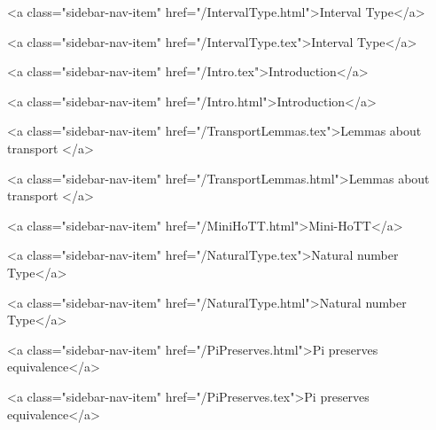       
        
          <a class="sidebar-nav-item" href="/IntervalType.html">Interval Type</a>
        
      
    
      
        
          <a class="sidebar-nav-item" href="/IntervalType.tex">Interval Type</a>
        
      
    
      
        
          <a class="sidebar-nav-item" href="/Intro.tex">Introduction</a>
        
      
    
      
        
          <a class="sidebar-nav-item" href="/Intro.html">Introduction</a>
        
      
    
      
        
          <a class="sidebar-nav-item" href="/TransportLemmas.tex">Lemmas about transport </a>
        
      
    
      
        
          <a class="sidebar-nav-item" href="/TransportLemmas.html">Lemmas about transport </a>
        
      
    
      
        
          <a class="sidebar-nav-item" href="/MiniHoTT.html">Mini-HoTT</a>
        
      
    
      
        
          <a class="sidebar-nav-item" href="/NaturalType.tex">Natural number Type</a>
        
      
    
      
        
          <a class="sidebar-nav-item" href="/NaturalType.html">Natural number Type</a>
        
      
    
      
        
          <a class="sidebar-nav-item" href="/PiPreserves.html">Pi preserves equivalence</a>
        
      
    
      
        
          <a class="sidebar-nav-item" href="/PiPreserves.tex">Pi preserves equivalence</a>
        
